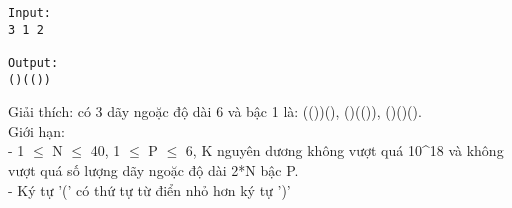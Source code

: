\begin{verbatim}
Input:
3 1 2

Output:
()(())
\end{verbatim}

   Giải thích: có 3 dãy ngoặc độ dài 6 và bậc 1 là: (())(), ()(()), ()()().   
\\   Giới hạn:   
\\   - 1  $\le$  N  $\le$  40, 1  $\le$  P  $\le$  6, K nguyên dương không vượt quá 10^18 và không vượt quá số lượng dãy ngoặc độ dài 2*N bậc P.   
\\   - Ký tự '(' có thứ tự từ điển nhỏ hơn ký tự ')'